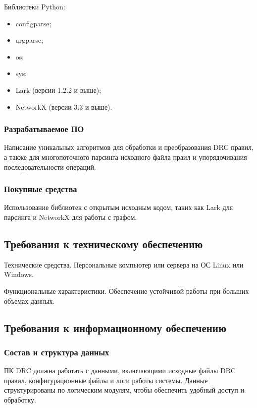 Библиотеки Python:

\begin{itemize}
	\item configparse;
	\item argparse;
	\item os;
	\item sys;
	\item Lark (версии 1.2.2 и выше);
	\item NetworkX (версии 3.3 и выше).
\end{itemize}

\subsubsection{Разрабатываемое ПО}

Написание уникальных алгоритмов для обработки и преобразования DRC правил,
а также для многопоточного парсинга исходного файла праил
и упорядочивания последовательности операций.

\subsubsection{Покупные средства}

Использование библиотек с открытым исходным кодом,
таких как Lark для парсинга и NetworkX для работы с графом.

\subsection{Требования к техническому обеспечению}

Технические средства.
Персональные компьютер или сервера на ОС Linux или Windows.

Функциональные характеристики.
Обеспечение устойчивой работы при больших объемах данных.

\subsection{Требования к информационному обеспечению}

\subsubsection{Состав и структура данных}

ПК DRC должна работать с данными, включающими исходные файлы DRC правил,
конфигурационные файлы и логи работы системы.
Данные структурированы по логическим модулям,
чтобы обеспечить удобный доступ и обработку.

